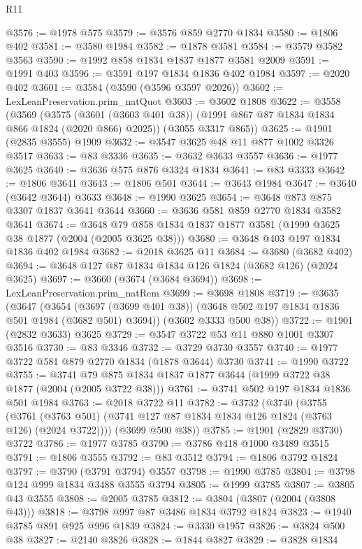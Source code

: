 \begin{lexlean}{R11}
\begin{coremodule}
@3576 := @1978 @575
@3579 := @3576 @859 @2770 @1834
@3580 := @1806 @402
@3581 := @3580 @1984
@3582 := @1878 @3581
@3584 := @3579 @3582 @3563
@3590 := @1992 @858 @1834 @1837 @1877 @3581 @2009
@3591 := @1991 @403
@3596 := @3591 @197 @1834 @1836 @402 @1984
@3597 := @2020 @402
@3601 := @3584 (@3590 (@3596 @3597 @2026))
@3602 := LexLeanPreservation.prim_natQuot
@3603 := @3602 @1808
@3622 := @3558
    (@3569
      (@3575 (@3601 (@3603 @401 @38)) (@1991 @867 @87 @1834 @1834 @866 @1824 (@2020 @866) @2025))
      (@3055 @3317 @865))
@3625 := @1901 (@2835 @3555) @1909
@3632 := @3547 @3625 @48 @11 @877 @1002 @3326 @3517
@3633 := @83 @3336
@3635 := @3632 @3633 @3557
@3636 := @1977 @3625
@3640 := @3636 @575 @876 @3324 @1834
@3641 := @83 @3333
@3642 := @1806 @3641
@3643 := @1806 @501
@3644 := @3643 @1984
@3647 := @3640 (@3642 @3644) @3633
@3648 := @1990 @3625
@3654 := @3648 @873 @875 @3307 @1837 @3641 @3644
@3660 := @3636 @581 @859 @2770 @1834 @3582 @3641
@3674 := @3648 @79 @858 @1834 @1837 @1877 @3581 (@1999 @3625 @38 @1877 (@2004 (@2005 @3625 @38)))
@3680 := @3648 @403 @197 @1834 @1836 @402 @1984
@3682 := @2018 @3625 @11
@3684 := @3680 (@3682 @402)
@3694 := @3648 @127 @87 @1834 @1834 @126 @1824 (@3682 @126) (@2024 @3625)
@3697 := @3660 (@3674 (@3684 @3694))
@3698 := LexLeanPreservation.prim_natRem
@3699 := @3698 @1808
@3719 := @3635
    (@3647
      (@3654 (@3697 (@3699 @401 @38)) (@3648 @502 @197 @1834 @1836 @501 @1984 (@3682 @501) @3694))
      (@3602 @3333 @500 @38))
@3722 := @1901 (@2832 @3633) @3625
@3729 := @3547 @3722 @53 @11 @880 @1001 @3307 @3516
@3730 := @83 @3346
@3732 := @3729 @3730 @3557
@3740 := @1977 @3722 @581 @879 @2770 @1834 (@1878 @3644) @3730
@3741 := @1990 @3722
@3755 := @3741 @79 @875 @1834 @1837 @1877 @3644 (@1999 @3722 @38 @1877 (@2004 (@2005 @3722 @38)))
@3761 := @3741 @502 @197 @1834 @1836 @501 @1984
@3763 := @2018 @3722 @11
@3782 := @3732
    (@3740
      (@3755
        (@3761 (@3763 @501) (@3741 @127 @87 @1834 @1834 @126 @1824 (@3763 @126) (@2024 @3722))))
      (@3699 @500 @38))
@3785 := @1901 (@2829 @3730) @3722
@3786 := @1977 @3785
@3790 := @3786 @418 @1000 @3489 @3515
@3791 := @1806 @3555
@3792 := @83 @3512
@3794 := @1806 @3792 @1824
@3797 := @3790 (@3791 @3794) @3557
@3798 := @1990 @3785
@3804 := @3798 @124 @999 @1834 @3488 @3555 @3794
@3805 := @1999 @3785
@3807 := @3805 @43 @3555
@3808 := @2005 @3785
@3812 := @3804 (@3807 (@2004 (@3808 @43)))
@3818 := @3798 @997 @87 @3486 @1834 @3792 @1824
@3823 := @1940 @3785 @891 @925 @996 @1839
@3824 := @3330 @1957
@3826 := @3824 @500 @38
@3827 := @2140 @3826
@3828 := @1844 @3827
@3829 := @3828 @1834

\end{coremodule}
\end{lexlean}
